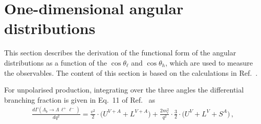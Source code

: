 \section{One-dimensional angular distributions}

This section describes the derivation of the functional form of the angular distributions 
as a function of the $\cos\theta_\ell$ and $\cos\theta_h$, which are used to measure
the observables. The content of this section is based on the calculations in Ref.~\cite{Gutsche:2013pp}. 

For unpolarised \Lb production,
%
%
integrating over the three angles the differential branching fraction is given in Eq.~11 of Ref.~\cite{Gutsche:2013pp} as
\begin{eqnarray}
\label{bjoint00}
\frac{d\Gamma(\Lambda_b \to \Lambda \,\ell^{+}\ell^{-})}{d q^2}=
\frac{v^{2}}{2}\cdot\bigg( U^{V+A} + L^{V+A} \bigg)
+\frac{2m_\ell^{2}}{q^{2}}\cdot\frac{3}{2}\cdot
\bigg( U^{V} + L^{V} + S^{A} \bigg)\,, 
\end{eqnarray}
